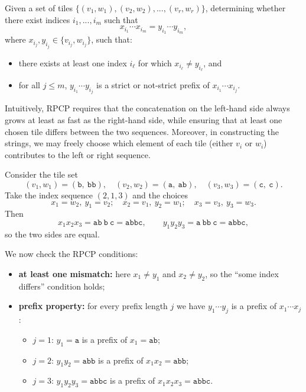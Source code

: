 \bigskip

\begin{definition}
	Given a set of tiles $\{(v_1, w_1), (v_2, w_2), ..., (v_r, w_r)\}$, 
	determining whether there exist indices $i_1, ..., i_m$ such that
	$$x_{i_1}\cdots x_{i_m} = y_{i_1}\cdots y_{i_m},$$
	where $x_{i_j}, y_{i_j} \in \{v_{i_j}, w_{i_j}\}$, such that:
	\begin{itemize}
		\item there exists at least one index $i_\ell$ for which $x_{i_\ell}\neq y_{i_\ell}$, and
		\item for all $j \leq m$, $y_{i_1}\cdots y_{i_j}$ is a strict or 
		not-strict prefix of $x_{i_1}\cdots x_{i_j}$.
	\end{itemize}
\end{definition}

\bigskip

Intuitively, RPCP requires that the concatenation on the left-hand side always 
grows at least as fast as the right-hand side, while ensuring that at least one 
chosen tile differs between the two sequences. Moreover, in constructing the 
strings, we may freely choose which element of each tile (either $v_i$ or $w_i$) 
contributes to the left or right sequence.

\bigskip

\begin{example}\label{exmp:rpcp}
Consider the tile set
\[
(v_1,w_1)=(\texttt{b},\ \texttt{bb}),\quad
(v_2,w_2)=(\texttt{a},\ \texttt{ab}),\quad
(v_3,w_3)=(\texttt{c},\ \texttt{c}).
\]
Take the index sequence $(2,1,3)$ and the choices
\[
x_1 = w_2,\ y_1 = v_2;\quad
x_2 = v_1,\ y_2 = w_1;\quad
x_3 = v_3,\ y_3 = w_3.
\]
Then
\[
x_1 x_2 x_3 = \texttt{ab}\ \texttt{b}\ \texttt{c} = \texttt{abbc},
\qquad
y_1 y_2 y_3 = \texttt{a}\ \texttt{bb}\ \texttt{c} = \texttt{abbc},
\]
so the two sides are equal.

We now check the RPCP conditions:
\begin{itemize}
  \item \textbf{at least one mismatch:} here $x_1\neq y_1$ and
        $x_2\neq y_2$, so the ``some index differs'' condition holds;
  \item \textbf{prefix property:} for every prefix length $j$ we have
        $y_{1}\cdots y_{j}$ is a prefix of $x_{1}\cdots x_{j}$:
        \begin{itemize}
          \item $j=1$: $y_1=\texttt{a}$ is a prefix of $x_1=\texttt{ab}$;
          \item $j=2$: $y_1y_2=\texttt{abb}$ is a prefix of $x_1x_2=\texttt{abb}$;
          \item $j=3$: $y_1y_2y_3=\texttt{abbc}$ is a prefix of $x_1x_2x_3=\texttt{abbc}$.
        \end{itemize}
\end{itemize}
\end{example}

